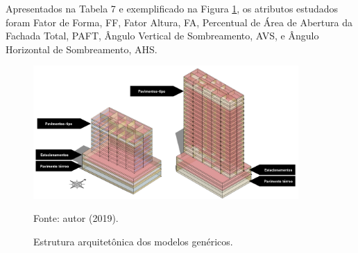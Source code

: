 \noindent Apresentados na Tabela 7 e exemplificado na Figura \ref{fig:figura9}, os atributos estudados foram Fator de 
Forma, FF, Fator Altura, FA, Percentual de Área de Abertura da Fachada Total, PAFT, Ângulo 
Vertical de Sombreamento, AVS, e Ângulo Horizontal de Sombreamento, AHS.\vspace*{0.3cm}
\begin{figure}[H]
    \centering
    \caption{\small Estrutura arquitetônica dos modelos genéricos.}
    \includegraphics[width=0.9\textwidth]{figures/fig11_8-19-2pav.png}
    \begin{flushleft}
        \par \small Fonte: autor (2019).
    \end{flushleft}
    \label{fig:figura9}
\end{figure}

